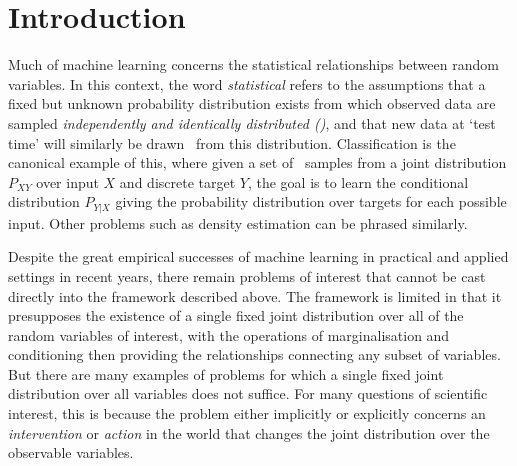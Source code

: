 

\section{Introduction}

Much of machine learning concerns the statistical relationships between random variables. In this context, the word \emph{statistical} refers to the assumptions that a fixed but unknown probability distribution exists from which observed data are sampled \emph{independently and identically distributed (\iid)}, and that new data at `test time' will similarly be drawn \iid~from this distribution.
Classification is the canonical example of this, where given a set of \iid~samples from a joint distribution $P_{XY}$ over input $X$ and discrete target $Y$, the goal is to learn the conditional distribution $P_{Y|X}$ giving the probability distribution over targets for each possible input. Other problems such as density estimation can be phrased similarly.

Despite the great empirical successes of machine learning in practical and applied settings in recent years, there remain problems of interest that cannot be cast directly into the framework described above. 
The framework is limited in that it presupposes the existence of a single fixed joint distribution over all of the random variables of interest, with the operations of marginalisation and conditioning then providing the relationships connecting any subset of variables.
But there are many examples of problems for which a single fixed joint distribution over all variables does not suffice. 
For many questions of scientific interest, this is because the problem either implicitly or explicitly concerns an \emph{intervention} or \emph{action} in the world that changes the joint distribution over the observable variables.

